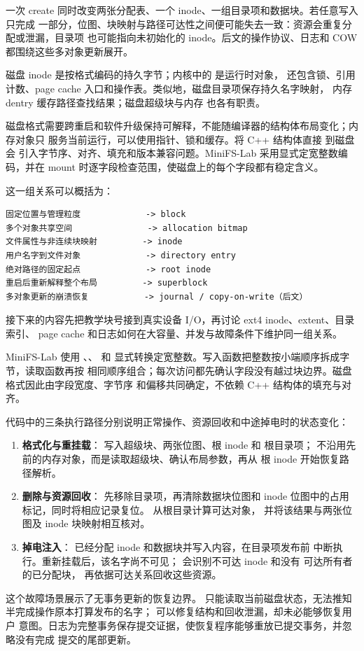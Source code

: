 一次 create 同时改变两张分配表、一个 inode、一组目录项和数据块。若任意写入只完成
一部分，位图、块映射与路径可达性之间便可能失去一致：资源会重复分配或泄漏，目录项
也可能指向未初始化的 inode。后文的操作协议、日志和 COW 都围绕这些多对象更新展开。


磁盘 inode 是按格式编码的持久字节；内核中的  是运行时对象，
还包含锁、引用计数、page cache 入口和操作表。类似地，磁盘目录项保存持久名字映射，
内存 dentry 缓存路径查找结果；磁盘超级块与内存  也各有职责。

磁盘格式需要跨重启和软件升级保持可解释，不能随编译器的结构体布局变化；内存对象只
服务当前运行，可以使用指针、锁和缓存。将 C++ 结构体直接  到磁盘会
引入字节序、对齐、填充和版本兼容问题。MiniFS-Lab 采用显式定宽整数编码，并在 mount
时逐字段检查范围，使磁盘上的每个字段都有稳定含义。

这一组关系可以概括为：

\begin{lstlisting}
固定位置与管理粒度             -> block
多个对象共享空间               -> allocation bitmap
文件属性与非连续块映射         -> inode
用户名字到文件对象             -> directory entry
绝对路径的固定起点             -> root inode
重启后重新解释整个布局         -> superblock
多对象更新的崩溃恢复           -> journal / copy-on-write（后文）
\end{lstlisting}

接下来的内容先把教学块号接到真实设备 I/O，再讨论 ext4 inode、extent、目录索引、
page cache 和日志如何在大容量、并发与故障条件下维护同一组关系。


MiniFS-Lab 使用 、、 和
 显式转换定宽整数。写入函数把整数按小端顺序拆成字节，读取函数再按
相同顺序组合；每次访问都先确认字段没有越过块边界。磁盘格式因此由字段宽度、字节序
和偏移共同确定，不依赖 C++ 结构体的填充与对齐。

代码中的三条执行路径分别说明正常操作、资源回收和中途掉电时的状态变化：

\begin{enumerate}\tightlist
\item \textbf{格式化与重挂载}： 写入超级块、两张位图、根 inode 和
  根目录项； 不沿用先前的内存对象，而是读取超级块、确认布局参数，再从
  根 inode 开始恢复路径解析。
\item \textbf{删除与资源回收}： 先移除目录项，再清除数据块位图和
  inode 位图中的占用标记，同时将相应记录复位。 从根目录计算可达对象，
  并将该结果与两张位图及 inode 块映射相互核对。
\item \textbf{掉电注入}： 已经分配 inode 和数据块并写入内容，在目录项发布前
  中断执行。重新挂载后，该名字尚不可见； 会识别不可达 inode 和没有
  可达所有者的已分配块， 再依据可达关系回收这些资源。
\end{enumerate}

这个故障场景展示了无事务更新的恢复边界。 只能读取当前磁盘状态，无法推知
半完成操作原本打算发布的名字； 可以修复结构和回收泄漏，却未必能够恢复用户
意图。日志为完整事务保存提交证据，使恢复程序能够重放已提交事务，并忽略没有完成
提交的尾部更新。
